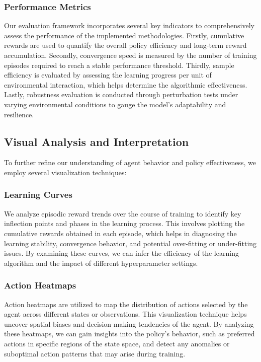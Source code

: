 \documentclass[../CSC_52081_EP.tex]{subfiles}
\begin{document}
\subsubsection{Performance Metrics}
Our evaluation framework incorporates several key indicators to comprehensively assess the performance of the implemented methodologies. Firstly, cumulative rewards are used to quantify the overall policy efficiency and long-term reward accumulation. Secondly, convergence speed is measured by the number of training episodes required to reach a stable performance threshold. Thirdly, sample efficiency is evaluated by assessing the learning progress per unit of environmental interaction, which helps determine the algorithmic effectiveness. Lastly, robustness evaluation is conducted through perturbation tests under varying environmental conditions to gauge the model's adaptability and resilience.


\subsection{Visual Analysis and Interpretation}
To further refine our understanding of agent behavior and policy effectiveness, we employ several visualization techniques:

\subsubsection{Learning Curves}
We analyze episodic reward trends over the course of training to identify key inflection points and phases in the learning process. This involves plotting the cumulative rewards obtained in each episode, which helps in diagnosing the learning stability, convergence behavior, and potential over-fitting or under-fitting issues. By examining these curves, we can infer the efficiency of the learning algorithm and the impact of different hyperparameter settings.

\subsubsection{Action Heatmaps}
Action heatmaps are utilized to map the distribution of actions selected by the agent across different states or observations. This visualization technique helps uncover spatial biases and decision-making tendencies of the agent. By analyzing these heatmaps, we can gain insights into the policy's behavior, such as preferred actions in specific regions of the state space, and detect any anomalies or suboptimal action patterns that may arise during training.
\end{document}
